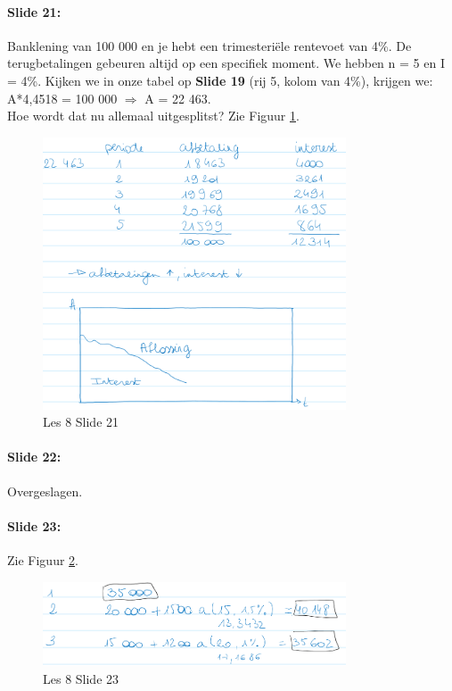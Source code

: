 \documentclass[10pt,a4paper]{report}
\begin{document}
\paragraph{Slide 21:} Banklening van 100 000 en je hebt een trimesteri\"ele rentevoet van 4\%. De terugbetalingen gebeuren altijd op een specifiek moment. We hebben n = 5 en I = 4\%. Kijken we in onze tabel op \textbf{Slide 19} (rij 5, kolom van 4\%), krijgen we: A*4,4518 = 100 000 $\Rightarrow$ A = 22 463.\\
Hoe wordt dat nu allemaal uitgesplitst? Zie Figuur \ref{les08_05}.

\begin{figure}[h!]
\centering
\includegraphics[width=90mm]{Les08_05.png}
\caption{Les 8 Slide 21} 
\label{les08_05}
\end{figure}

\paragraph{Slide 22:} Overgeslagen.

\paragraph{Slide 23:} Zie Figuur \ref{les08_06}.

\begin{figure}[h!]
\centering
\includegraphics[width=90mm]{Les08_06.png}
\caption{Les 8 Slide 23} 
\label{les08_06}
\end{figure}
\end{document}
